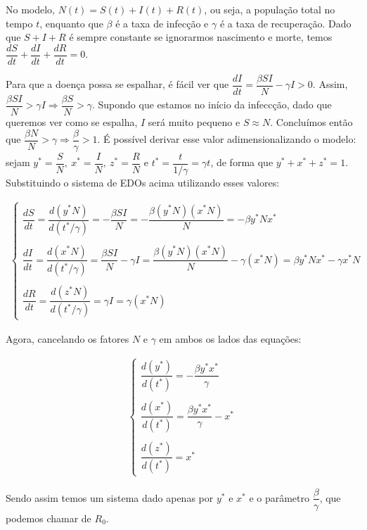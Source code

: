\documentclass[12pt]{article}
\begin{document}
No modelo, $N(t) = S(t)+I(t)+R(t)$, ou seja, a população total no tempo $t$, enquanto que $\beta$ é a taxa de infecção e $\gamma$ é a taxa de recuperação. Dado que $S+I+R$ é sempre constante se ignorarmos nascimento e morte, temos $\dfrac{dS}{dt}+\dfrac{dI}{dt}+\dfrac{dR}{dt} = 0$. 

Para que a doença possa se espalhar, é fácil ver que $\dfrac{dI}{dt} = \dfrac{\beta SI}{N} - \gamma I > 0$. Assim, $\dfrac{\beta SI}{N} > \gamma I \Rightarrow \dfrac{\beta S}{N} > \gamma$. Supondo que estamos no início da infeccção, dado que queremos ver como se espalha, $I$ será muito pequeno e $S \approx N$. Concluímos então que $\dfrac{\beta N}{N} > \gamma \Rightarrow \dfrac{\beta}{\gamma} > 1$. É possível derivar esse valor adimensionalizando o modelo: sejam $y^* = \dfrac{S}{N}, \ x^* = \dfrac{I}{N}, \ z^* = \dfrac{R}{N}$ e $t^*=\dfrac{t}{1/\gamma} = \gamma t$, de forma que $y^*+x^*+z^*=1$. Substituindo o sistema de EDOs acima utilizando esses valores:

\begin{gather*}
\begin{cases}
\dfrac{dS}{dt} = \dfrac{d(y^*N)}{d(t^*/\gamma)} = -\dfrac{\beta SI}{N} = -\dfrac{\beta(y^*N)(x^*N)}{N} = -\beta y^*Nx^* \\
\\
\dfrac{dI}{dt} = \dfrac{d(x^*N)}{d(t^*/\gamma)} = \dfrac{\beta SI}{N} - \gamma I = \dfrac{\beta(y^*N)(x^*N)}{N} -\gamma(x^*N) = \beta y^*Nx^* - \gamma x^*N \\
\\
\dfrac{dR}{dt} = \dfrac{d(z^*N)}{d(t^*/\gamma)} = \gamma I = \gamma(x^*N)
\end{cases}
\end{gather*}

Agora, cancelando os fatores $N$ e $\gamma$ em ambos os lados das equações:

\begin{gather*}
\begin{cases}
\dfrac{d(y^*)}{d(t^*)} = -\dfrac{\beta y^*x^*}{\gamma} \\
\\
\dfrac{d(x^*)}{d(t^*)} = \dfrac{\beta y^*x^*}{\gamma} - x^* \\
\\
\dfrac{d(z^*)}{d(t^*)} = x^*
\end{cases}
\end{gather*}

Sendo assim temos um sistema dado apenas por $y^*$ e $x^*$ e o parâmetro $\dfrac{\beta}{\gamma}$, que podemos chamar de $R_0$.
 
\end{document}
